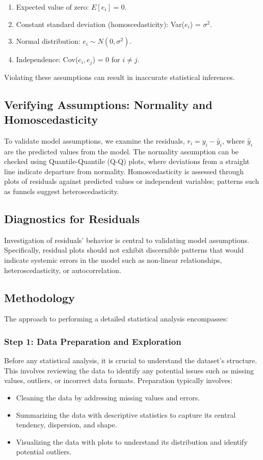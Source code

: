 \documentclass{article}
\begin{document}
\begin{enumerate}
    \item Expected value of zero: $E[e_i] = 0$.
    \item Constant standard deviation (homoscedasticity): Var($e_i$) = $\sigma^2$.
    \item Normal distribution: $e_i \sim N(0, \sigma^2)$.
    \item Independence: Cov($e_i, e_j$) = 0 for $i \neq j$.
\end{enumerate}

Violating these assumptions can result in inaccurate statistical inferences.

\subsection{Verifying Assumptions: Normality and Homoscedasticity}
To validate model assumptions, we examine the residuals, $r_i = y_i - \hat{y}_i$, where $\hat{y}_i$ are the predicted values from the model. The normality assumption can be checked using Quantile-Quantile (Q-Q) plots, where deviations from a straight line indicate departure from normality. Homoscedasticity is assessed through plots of residuals against predicted values or independent variables; patterns such as funnels suggest heteroscedasticity.

\subsection{Diagnostics for Residuals}
Investigation of residuals' behavior is central to validating model assumptions. Specifically, residual plots should not exhibit discernible patterns that would indicate systemic errors in the model such as non-linear relationships, heteroscedasticity, or autocorrelation.

\subsection{Methodology}
The approach to performing a detailed statistical analysis encompasses:

\subsubsection*{Step 1: Data Preparation and Exploration}
Before any statistical analysis, it is crucial to understand the dataset's structure. This involves reviewing the data to identify any potential issues such as missing values, outliers, or incorrect data formats. Preparation typically involves:
\begin{itemize}
    \item Cleaning the data by addressing missing values and errors.
    \item Summarizing the data with descriptive statistics to capture its central tendency, dispersion, and shape.
    \item Visualizing the data with plots to understand its distribution and identify potential outliers.
\end{itemize}
\end{document}
